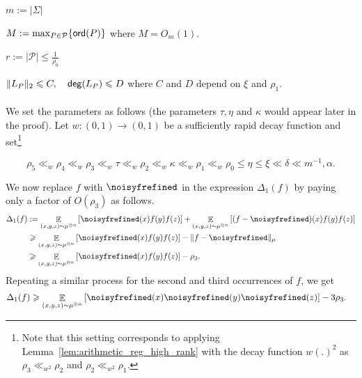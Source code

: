 \documentclass[11pt]{article}
\newcommand\norm[1]{\| #1 \|}
\newcommand\Expect[2]{{\mathop{\mathbb{E}}_{#1}\left[ {#2} \right]}}
\renewcommand\geq{\geqslant}
\renewcommand\leq{\leqslant}
\newcommand{\V}[1]{{#1}}
\newcommand{\abnote}[1]{({\color{blue} AB: #1})}
\begin{document}
$m := |\Sigma|$


$M := \max_{P\in \mathcal{P}} \{{\sf ord}(P) \}$ where $M= O_m(1)$.

$r:= |\mathcal{P}|  \leq \frac{1}{\rho_0}$

$\|L_P\|_2\leq C, \quad {\sf deg}(L_P) \leq D$ where $C$ and $D$ depend on $\xi$ and $\rho_1$.\\
\\
%
We set the parameters as follows (the parameters $\tau, \eta$ and $\kappa$ would appear later in the proof).  Let $w\colon (0,1)\to(0,1)$ be a sufficiently rapid decay function and set\footnote{Note that this setting corresponds to applying Lemma~\ref{lem:arithmetic_reg_high_rank} with the decay function $w(.)^2$ as $\rho_3\ll_{w^2} \rho_2$ and $\rho_2\ll_{w^2}\rho_1$.}

\begin{equation}
    \label{eq:parameters}
    \rho_5\ll_w \rho_4\ll_w \rho_3\ll_w \tau\ll_w \rho_2\ll_w \kappa\ll_w \rho_1 \ll_w \rho_0 \leq \eta \leq \xi  \ll \delta \ll m^{-1},\alpha.
\end{equation}




We now replace $f$ with $\noisyfrefined$ in the expression $\Delta_1(f)$ by paying only a factor of $O(\rho_3)$ as follows.
%
\begin{align}
    \Delta_1(f) &:=\Expect{(\V x, \V y, \V z)\sim \mu^{\otimes n}}{ \noisyfrefined(\V x) f(\V y) f(\V z)} + \Expect{(\V x, \V y, \V z)\sim \mu^{\otimes n}}{ (f- \noisyfrefined)(\V x) f(\V y) f(\V z)} \nonumber\\
    & \geq  \Expect{(\V x, \V y, \V z)\sim \mu^{\otimes n}}{\noisyfrefined(\V x) f(\V y) f(\V z)} - \norm{f-\noisyfrefined}_{\mu}\nonumber\\
        & \geq \Expect{(\V x, \V y, \V z)\sim \mu^{\otimes n}}{\noisyfrefined(\V x) f(\V y) f(\V z)}- \rho_3.\nonumber
 \end{align}
Repeating a similar process for the second and third occurrences of $f$, we get
\begin{align}
    \Delta_1(f) & \geq\Expect{(\V x, \V y, \V z)\sim \mu^{\otimes n}}{ \noisyfrefined(\V x) \noisyfrefined(\V y) \noisyfrefined(\V z)}- 3\rho_3. \label{eq:delta1_to_delta2}
\end{align}
\end{document}
